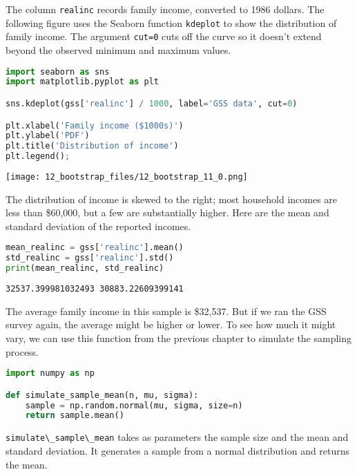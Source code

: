 The column \passthrough{\lstinline!realinc!} records family income,
converted to 1986 dollars. The following figure uses the Seaborn
function \passthrough{\lstinline!kdeplot!} to show the distribution of
family income. The argument \passthrough{\lstinline!cut=0!} cuts off the
curve so it doesn't extend beyond the observed minimum and maximum
values.

\begin{lstlisting}[language=Python,style=source]
import seaborn as sns
import matplotlib.pyplot as plt

sns.kdeplot(gss['realinc'] / 1000, label='GSS data', cut=0)

plt.xlabel('Family income ($1000s)')
plt.ylabel('PDF')
plt.title('Distribution of income')
plt.legend();
\end{lstlisting}

\begin{center}
\texttt{[image: 12\_bootstrap\_files/12\_bootstrap\_11\_0.png]}
\end{center}

The distribution of income is skewed to the right; most household
incomes are less than \$60,000, but a few are substantially higher. Here
are the mean and standard deviation of the reported incomes.

\begin{lstlisting}[language=Python,style=source]
mean_realinc = gss['realinc'].mean()
std_realinc = gss['realinc'].std()
print(mean_realinc, std_realinc)
\end{lstlisting}

\begin{lstlisting}[style=output]
32537.399981032493 30883.22609399141
\end{lstlisting}

The average family income in this sample is \$32,537. But if we ran the
GSS survey again, the average might be higher or lower. To see how much
it might vary, we can use this function from the previous chapter to
simulate the sampling process.

\begin{lstlisting}[language=Python,style=source]
import numpy as np

def simulate_sample_mean(n, mu, sigma):
    sample = np.random.normal(mu, sigma, size=n)
    return sample.mean()
\end{lstlisting}

\passthrough{\lstinline!simulate\_sample\_mean!} takes as parameters the
sample size and the mean and standard deviation. It generates a sample
from a normal distribution and returns the mean.

